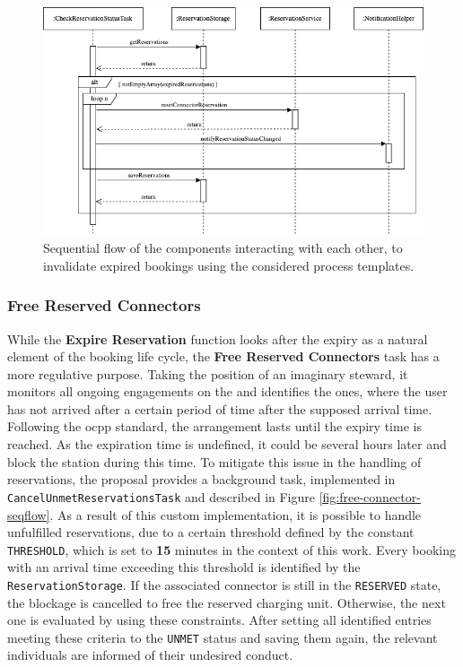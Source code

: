 \begin{figure}[h]
    \centering
    \includegraphics[scale=0.5]{resources/images/main/6_implementation/processes/scheduler/UpdateExpiredReservations.png}
    \caption{Sequential flow of the components interacting with each other, to invalidate expired bookings using the considered process templates.}
    \label{fig:expire-reservation-seqflow}
\end{figure}

\newpage

\subsubsection{Free Reserved Connectors}
\label{ch:Implementation:sec:Reservation System:ssec:Scheduling Capabilities:sssec:Free Reserved Connectors}

While the \textbf{Expire Reservation} function looks after the expiry as a natural element of the booking life cycle, the \textbf{Free Reserved Connectors} task has a more regulative purpose.
Taking the position of an imaginary steward, it monitors all ongoing engagements on the  and identifies the ones, where the user has not arrived after a certain period of time after the supposed arrival time.
Following the \acrshort{ocpp} standard, the arrangement lasts until the expiry time is reached. As the expiration time is undefined, it could be several hours later and block the station during this time. 
To mitigate this issue in the handling of reservations, the proposal provides a background task, implemented in \texttt{CancelUnmetReservationsTask} and described in Figure \ref{fig:free-connector-seqflow}.
As a result of this custom implementation, it is possible to handle unfulfilled reservations, due to a certain threshold defined by the constant \texttt{THRESHOLD}, which is set to \textbf{15} minutes in the context of this work.
Every booking with an arrival time exceeding this threshold is identified by the \texttt{ReservationStorage}. If the associated connector is still in the \texttt{RESERVED} state, the blockage is cancelled to free the reserved charging unit.
Otherwise, the next one is evaluated by using these constraints.
After setting all identified entries meeting these criteria to the \texttt{UNMET} status and saving them again, the relevant individuals are informed of their undesired conduct.

